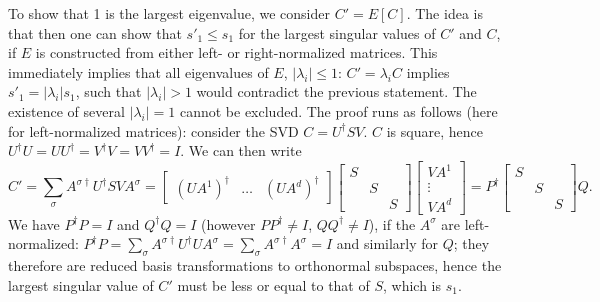 \documentclass[a4paper,10pt,oneside,onecolumn,1p,times]{elsarticle}
\begin{document}
To show that 1 is the largest eigenvalue\cite{Weichselbaum05}, we consider $C' = E[C]$. The idea is that then one can show that $s'_1 \leq s_1$ for the largest singular values of $C'$ and $C$, if $E$ is constructed from either left- or right-normalized matrices. This immediately implies that all eigenvalues of $E$, $|\lambda_i| \leq 1$: $C'=\lambda_i C$ implies $s'_1 = |\lambda_i| s_1$, such that $|\lambda_i|>1$ would contradict the previous statement. The existence of several $|\lambda_i|=1$ cannot be excluded.
The proof runs as follows (here for left-normalized matrices): consider the SVD $C = U^\dagger S V$. $C$ is square, hence $U^\dagger U = UU^\dagger = V^\dagger V = VV^\dagger = I$. We can then write 
\begin{equation}
C' = \sum_\sigma A^{\sigma\dagger} U^\dagger S V A^{\sigma} = 
\left[ \begin{array}{ccc} (UA^1)^\dagger & \ldots  & (UA^d)^\dagger \end{array} \right]
\left[ \begin{array}{ccc} S & & \\ & S & \\ & & S \end{array} \right]
\left[ \begin{array}{c} VA^1 \\ \vdots \\ VA^d \end{array} \right] = P^\dagger \left[ \begin{array}{ccc} S & & \\ & S & \\ & & S \end{array} \right] Q .
\end{equation}
We have $P^\dagger P = I$ and $Q^\dagger Q = I$ (however $PP^\dagger \neq I$, $QQ^\dagger \neq I$), if the $A^\sigma$ are left-normalized: $P^\dagger P =\sum_\sigma A^{\sigma\dagger} U^\dagger U A^\sigma = \sum_\sigma A^{\sigma\dagger} A^\sigma = I$ and similarly for $Q$; they therefore are reduced basis transformations to orthonormal subspaces, hence the largest singular value of $C'$ must be less or equal to that of $S$, which is $s_1$.
\end{document}
